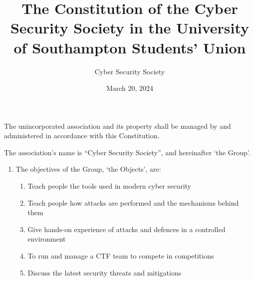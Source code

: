 \documentclass[12pt]{constitution}
\begin{document}

\title{The Constitution of the Cyber Security Society in the University of Southampton Students' Union}
\author{Cyber Security Society}
\date{March 20, 2024}
\maketitle


\label{clause:adoption-constitution}

The unincorporated association and its property shall be managed by and administered in accordance with this Constitution.


\label{clause:name}

The association's name is ``Cyber Security Society'', and hereinafter `the Group'.


\label{clause:objects}

\begin{enumerate}
    \item The objectives of the Group, `the Objects', are:
    \begin{enumerate}
        \item Teach people the tools used in modern cyber security
        \item Teach people how attacks are performed and the mechanisms behind them
        \item Give hands-on experience of attacks and defences in a controlled environment
        \item To run and manage a CTF team to compete in competitions
        \item Discuss the latest security threats and mitigations
    \end{enumerate}
\end{enumerate}


\label{clause:membership}
\end{document}
